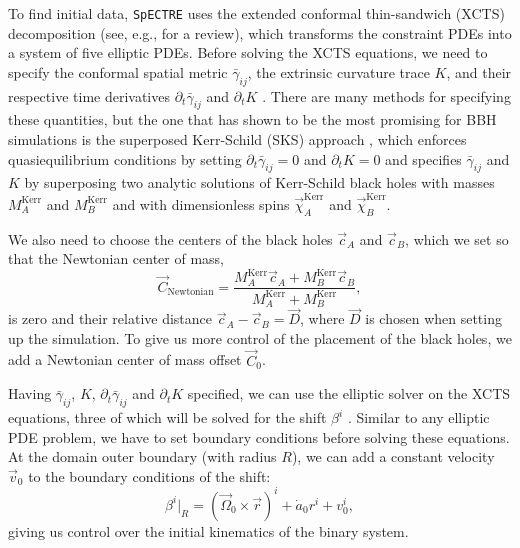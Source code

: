 \documentclass{../document}
\begin{document}
      To find initial data, {\tt SpECTRE} uses the extended conformal thin-sandwich (XCTS) decomposition (see, e.g., \cite{BaumgarteShapiro} for a review), which transforms the constraint PDEs into a system of five elliptic PDEs. Before solving the XCTS equations, we need to specify the conformal spatial metric $\bar\gamma_{ij}$, the extrinsic curvature trace $K$, and their respective time derivatives $\partial_t \bar\gamma_{ij}$ and $\partial_t K$ \cite{BaumgarteShapiro}. There are many methods for specifying these quantities, but the one that has shown to be the most promising for BBH simulations is the superposed Kerr-Schild (SKS) approach \cite{Lovelace2008}, which enforces quasiequilibrium conditions by setting $\partial_t \bar\gamma_{ij}=0$ and $\partial_t K=0$ and specifies $\bar\gamma_{ij}$ and $K$ by superposing two analytic solutions of Kerr-Schild black holes with masses $M^\text{Kerr}_A$ and $M^\text{Kerr}_B$ and with dimensionless spins $\vec\chi^\text{Kerr}_A$ and $\vec\chi^\text{Kerr}_B$.
      
      We also need to choose the centers of the black holes $\vec c_A$ and $\vec c_B$, which we set so that the Newtonian center of mass,
      \begin{equation} \label{eq:CoM-Newtonian}
        \vec C_\text{Newtonian} = \frac{M^\text{Kerr}_A \vec c_A + M^\text{Kerr}_B \vec c_B}{M^\text{Kerr}_A + M^\text{Kerr}_B},
      \end{equation}
      is zero and their relative distance $\vec c_A - \vec c_B = \vec D$, where $\vec D$ is chosen when setting up the simulation. To give us more control of the placement of the black holes, we add a Newtonian center of mass offset $\vec C_0$.

      Having $\bar\gamma_{ij}$, $K$, $\partial_t \bar\gamma_{ij}$ and $\partial_t K$ specified, we can use the elliptic solver on the XCTS equations, three of which will be solved for the shift $\beta^i$ \cite{BaumgarteShapiro}. Similar to any elliptic PDE problem, we have to set boundary conditions before solving these equations. At the domain outer boundary (with radius $R$), we can add a constant velocity $\vec v_0$ to the boundary conditions of the shift:
      \begin{equation} \label{eq:shift-boundary-condition}
        \beta^i|_R = (\vec \Omega_0 \times \vec r)^i + \dot a_0 r^i + v_0^i,
      \end{equation}
      giving us control over the initial kinematics of the binary system.
\end{document}
